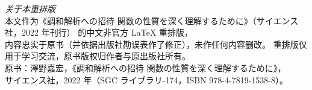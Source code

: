 \thispagestyle{empty}
\begin{center}
    \small
    \noindent\emph{关于本重排版}\\[0.5em]
    本文件为《調和解析への招待 関数の性質を深く理解するために》（サイエンス社，2022 年刊行）
    的中文非官方 \LaTeX{} 重排版，\\
    内容忠实于原书（并依据出版社勘误表作了修正），未作任何内容删改。
    重排版仅用于学习交流，原书版权归作者与原出版社所有。\\
    \vspace{0.5cm}
    原书：澤野嘉宏，《調和解析への招待 関数の性質を深く理解するために》，\\
    サイエンス社，2022 年（SGC ライブラリ-174，ISBN 978-4-7819-1538-8）。
\end{center}
